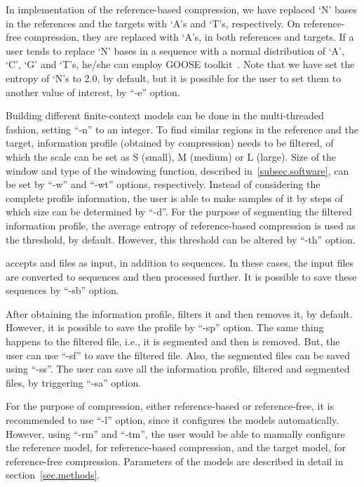 In implementation of the reference-based compression, we have replaced `N' bases in the references and the targets with `A's and `T's, respectively. On reference-free compression, they are replaced with `A's, in both references and targets. If a user tends to replace `N' bases in a sequence with a normal distribution of `A', `C', `G' and `T's, he/she can employ GOOSE toolkit~\cite{web-goose}. Note that we have set the entropy of `N's to 2.0, by default, but it is possible for the user to set them to another value of interest, by ``-e'' option.

Building different finite-context models can be done in the multi-threaded fashion, setting ``-n'' to an integer. To find similar regions in the reference and the target, information profile (obtained by compression) needs to be filtered, of which the scale can be set as S (small), M (medium) or L (large). Size of the window and type of the windowing function, described in~\ref{subsec.software}, can be set by ``-w'' and ``-wt'' options, respectively. Instead of considering the complete profile information, the user is able to make samples of it by steps of which size can be determined by ``-d''. For the purpose of segmenting the filtered information profile, the average entropy of reference-based compression is used as the threshold, by default. However, this threshold can be altered by ``-th'' option.

\smashpp accepts \fasta and \fastq files as input, in addition to sequences. In these cases, the input files are converted to sequences and then processed further. It is possible to save these sequences by ``-sb'' option.

After obtaining the information profile, \smashpp filters it and then removes it, by default. However, it is possible to save the profile by ``-sp'' option. The same thing happens to the filtered file, i.e., it is segmented and then is removed. But, the user can use ``-sf'' to save the filtered file. Also, the segmented files can be saved using ``-ss''. The user can save all the information profile, filtered and segmented files, by triggering ``-sa'' option.

For the purpose of compression, either reference-based or reference-free, it is recommended to use ``-l'' option, since it configures the models automatically. However, using ``-rm'' and ``-tm'', the user would be able to manually configure the reference model, for reference-based compression, and the target model, for reference-free compression. Parameters of the models are described in detail in section~\ref{sec.methods}.

